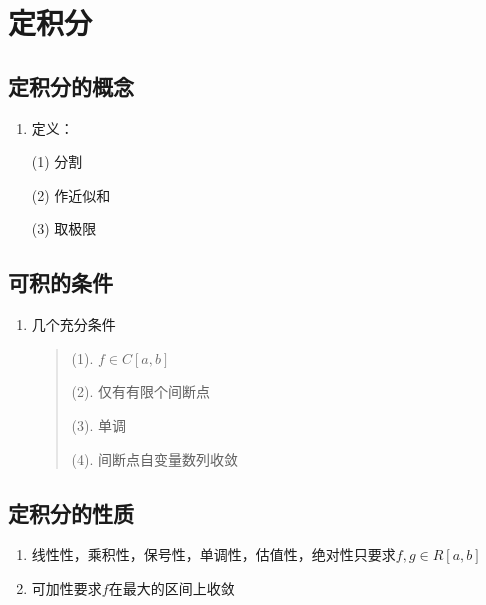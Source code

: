 \documentclass[
]{article}
\author{}
\date{}
\begin{document}
\hypertarget{ux5b9aux79efux5206}{%
\section{定积分}\label{ux5b9aux79efux5206}}

\tableofcontents

\hypertarget{ux5b9aux79efux5206ux7684ux6982ux5ff5}{%
\subsection{定积分的概念}\label{ux5b9aux79efux5206ux7684ux6982ux5ff5}}

\begin{enumerate}
\def\labelenumi{\arabic{enumi}.}
\item
  定义：

  (1) 分割

  (2) 作近似和

  (3) 取极限
\end{enumerate}

\hypertarget{ux53efux79efux7684ux6761ux4ef6}{%
\subsection{可积的条件}\label{ux53efux79efux7684ux6761ux4ef6}}

\begin{enumerate}
\def\labelenumi{\arabic{enumi}.}
\item
  几个充分条件

  \begin{quote}
  (1). \(f\in C[a,b]\)

  (2). 仅有有限个间断点

  (3). 单调

  (4). 间断点自变量数列收敛
  \end{quote}
\end{enumerate}

\hypertarget{ux5b9aux79efux5206ux7684ux6027ux8d28}{%
\subsection{定积分的性质}\label{ux5b9aux79efux5206ux7684ux6027ux8d28}}

\begin{enumerate}
\def\labelenumi{\arabic{enumi}.}
\item
  线性性，乘积性，保号性，单调性，估值性，绝对性只要求\(f,g\in R[a,b]\)
\item
  可加性要求\(f\)在最大的区间上收敛
\end{enumerate}
\end{document}
